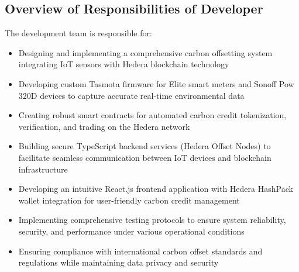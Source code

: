 \documentclass[oneside,a4paper,12pt]{book}
\begin{document}
\subsection{Overview of Responsibilities of Developer}
The development team is responsible for:
\begin{itemize}
    \item Designing and implementing a comprehensive carbon offsetting system integrating IoT sensors with Hedera blockchain technology
    \item Developing custom Tasmota firmware for Elite smart meters and Sonoff Pow 320D devices to capture accurate real-time environmental data
    \item Creating robust smart contracts for automated carbon credit tokenization, verification, and trading on the Hedera network
    \item Building secure TypeScript backend services (Hedera Offset Nodes) to facilitate seamless communication between IoT devices and blockchain infrastructure
    \item Developing an intuitive React.js frontend application with Hedera HashPack wallet integration for user-friendly carbon credit management
    \item Implementing comprehensive testing protocols to ensure system reliability, security, and performance under various operational conditions
    \item Ensuring compliance with international carbon offset standards and regulations while maintaining data privacy and security
\end{itemize}
\end{document}
